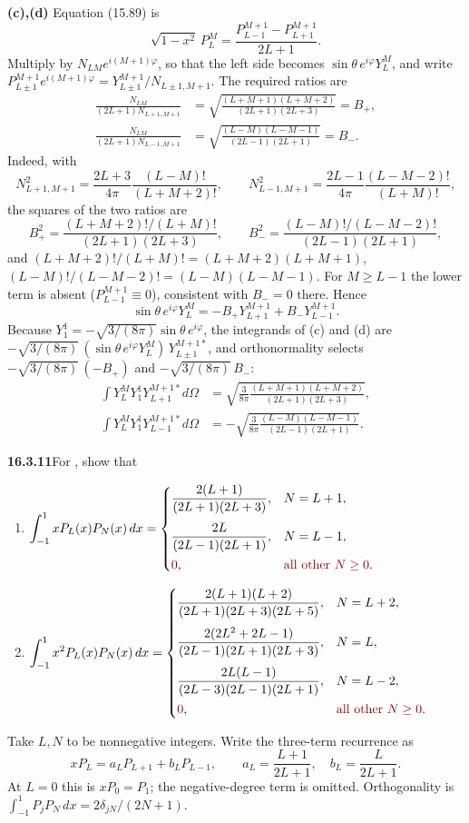 \textbf{(c),(d)} Equation (15.89) is
\[
\sqrt{1-x^2}\,P_L^M=
\frac{P_{L-1}^{M+1}-P_{L+1}^{M+1}}{2L+1}.
\]
Multiply by $N_{LM}e^{i(M+1)\varphi}$, so that the left side becomes
$\sin\theta\,e^{i\varphi}Y_L^M$, and write
$P_{L\pm1}^{M+1}e^{i(M+1)\varphi}=Y_{L\pm1}^{M+1}/N_{L\pm1,M+1}$.
The required ratios are
\[
\begin{aligned}
\frac{N_{LM}}{(2L+1)N_{L+1,M+1}}
&=\sqrt{\frac{(L+M+1)(L+M+2)}{(2L+1)(2L+3)}}=B_+,\\
\frac{N_{LM}}{(2L+1)N_{L-1,M+1}}
&=\sqrt{\frac{(L-M)(L-M-1)}{(2L-1)(2L+1)}}=B_-.
\end{aligned}
\]
Indeed, with
\[
N_{L+1,M+1}^2=\frac{2L+3}{4\pi}\frac{(L-M)!}{(L+M+2)!},\qquad
N_{L-1,M+1}^2=\frac{2L-1}{4\pi}\frac{(L-M-2)!}{(L+M)!},
\]
the squares of the two ratios are
\[
B_+^2=\frac{(L+M+2)!/(L+M)!}{(2L+1)(2L+3)},\qquad
B_-^2=\frac{(L-M)!/(L-M-2)!}{(2L-1)(2L+1)},
\]
and $(L+M+2)!/(L+M)!=(L+M+2)(L+M+1)$,
$(L-M)!/(L-M-2)!=(L-M)(L-M-1)$.
For $M\ge L-1$ the lower term is absent ($P_{L-1}^{M+1}\equiv0$),
consistent with $B_-=0$ there.
Hence
\[
\sin\theta\,e^{i\varphi}Y_L^M
=-B_+Y_{L+1}^{M+1}+B_-Y_{L-1}^{M+1}.
\]
Because $Y_1^1=-\sqrt{3/(8\pi)}\sin\theta\,e^{i\varphi}$, the
integrands of (c) and (d) are
$-\sqrt{3/(8\pi)}\,(\sin\theta\,e^{i\varphi}Y_L^M)\,Y_{L\pm1}^{M+1*}$,
and orthonormality selects $-\sqrt{3/(8\pi)}\,(-B_+)$ and
$-\sqrt{3/(8\pi)}\,B_-$:
\[
\boxed{\begin{aligned}
\int Y_L^MY_1^1Y_{L+1}^{M+1*}d\Omega
&=\sqrt{\frac3{8\pi}
\frac{(L+M+1)(L+M+2)}{(2L+1)(2L+3)}},\\
\int Y_L^MY_1^1Y_{L-1}^{M+1*}d\Omega
&=-\sqrt{\frac3{8\pi}
\frac{(L-M)(L-M-1)}{(2L-1)(2L+1)}}.
\end{aligned}}
\]

\par\bigskip
\noindent\textbf{16.3.11}\quad For , show that
\begin{enumerate}
\item[(a)] $\displaystyle\int_{-1}^{1}xP_{L}(x)P_{N}(x)\,dx
=\begin{cases}
\dfrac{2(L+1)}{(2L+1)(2L+3)}, & N=L+1,\\[12pt]
\dfrac{2L}{(2L-1)(2L+1)}, & N=L-1,\\[8pt]
\erratum{0}, & \erratum{\text{all other }N\ge0}.
\end{cases}$
\item[(b)] $\displaystyle\int_{-1}^{1}x^{2}P_{L}(x)P_{N}(x)\,dx
=\begin{cases}
\dfrac{2(L+1)(L+2)}{(2L+1)(2L+3)(2L+5)}, & N=L+2,\\[12pt]
\dfrac{2(2L^{2}+2L-1)}{(2L-1)(2L+1)(2L+3)}, & N=L,\\[12pt]
\dfrac{2L(L-1)}{(2L-3)(2L-1)(2L+1)}, & N=L-2,\\[8pt]
\erratum{0}, & \erratum{\text{all other }N\ge0}.
\end{cases}$
\end{enumerate}
\solution
Take $L,N$ to be nonnegative integers. Write the three-term recurrence
as
\[
xP_L=a_LP_{L+1}+b_LP_{L-1},\qquad
a_L=\frac{L+1}{2L+1},\quad b_L=\frac{L}{2L+1}.
\]
At $L=0$ this is $xP_0=P_1$; the negative-degree term is omitted.
Orthogonality is
$\int_{-1}^1P_jP_N\,dx=2\delta_{jN}/(2N+1)$.

